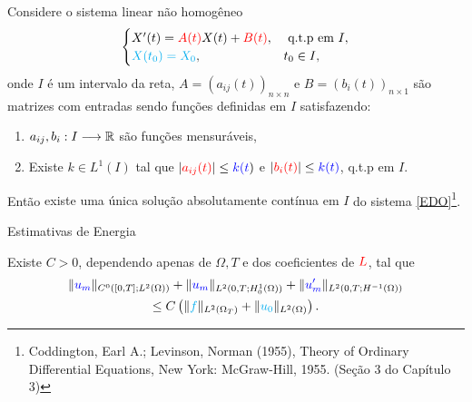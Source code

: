 \begin{frame}
\begin{teo}
Considere o {\color{blue}sistema linear não homogêneo}
\begin{equation}
\begin{cases}\label{EDO}
X'(t)={\color{red}A(t)}X(t)+{\color{red}B(t)}, & \text{ q.t.p em } I,\\
{\color{cyan}X(t_0)=X_0}, & t_0\in I,
\end{cases}
\end{equation}
onde \(I\) é um intervalo da reta, {\color{red} \(A=\left(a_{ij}(t)\right)_{n\times n}\) e 
\(B=\left(b_{i}(t)\right)_{n\times 1}\)} são matrizes com entradas sendo funções definidas 
em \(I\) satisfazendo:
\begin{enumerate}
\item{\color{red} \(a_{ij}, b_i:I\longrightarrow \mathbb{R}\) }são funções mensuráveis,
\item Existe  {\color{blue}\(k\in L^1(I)\)} tal que \(|{\color{red}a_{ij}(t)}|\leq {\color{blue}k(t})\) e \(|{\color{red}b_i(t)}|\leq {\color{blue}k(t)}\), 
q.t.p em \(I\).
\end{enumerate}
Então {\color{blue}existe uma única solução absolutamente contínua em \(I\)} do sistema 
\eqref{EDO}\footnote{Coddington, Earl A.; Levinson, Norman (1955), 
Theory of Ordinary Differential Equations, New York: McGraw-Hill, 1955. (Seção 3 do 
Capítulo 3)}. 
\end{teo}
\end{frame}
\begin{frame}{Estimativas de Energia}
\begin{teo}
Existe \(C>0\), dependendo apenas de \(\Omega, T\) e dos coeficientes de 
\({\color{red}L}\), tal que 
\begin{multline*}
\lVert{\color{blue}u_m}\rVert_{C^0([0,T];L^2(\Omega))}+\lVert{\color{blue}u_m}\rVert_{L^2(0,T;H_0^1(\Omega))}
+\lVert{\color{blue}u_m^\prime}\rVert_{L^2(0,T;H^{-1}(\Omega))}\\
\leq C\left(\lVert{\color{cyan}f}\rVert_{L^2(\Omega_T)}+\lVert{\color{cyan}u_0}\rVert_{L^2(\Omega)}\right).
\end{multline*}
\end{teo}
\end{frame}
